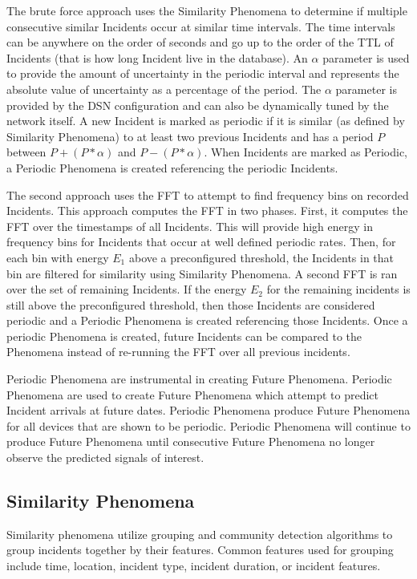 The brute force approach uses the Similarity Phenomena to determine if multiple consecutive similar Incidents occur at similar time intervals. The time intervals can be anywhere on the order of seconds and go up to the order of the TTL of Incidents (that is how long Incident live in the database). An $\alpha$ parameter is used to provide the amount of uncertainty in the periodic interval and represents the absolute value of uncertainty as a percentage of the period. The $\alpha$ parameter is provided by the DSN configuration and can also be dynamically tuned by the network itself. A new Incident is marked as periodic if it is similar (as defined by Similarity Phenomena) to at least two previous Incidents and has a period $P$ between $P + (P * \alpha)$ and $P - (P * \alpha)$. When Incidents are marked as Periodic, a Periodic Phenomena is created referencing the periodic Incidents.

The second approach uses the FFT to attempt to find frequency bins on recorded Incidents. This approach computes the FFT in two phases. First, it computes the FFT over the timestamps of all Incidents. This will provide high energy in frequency bins for Incidents that occur at well defined periodic rates. Then, for each bin with energy $E_1$ above a preconfigured threshold, the Incidents in that bin are filtered for similarity using Similarity Phenomena. A second FFT is ran over the set of remaining Incidents. If the energy $E_2$ for the remaining incidents is still above the preconfigured threshold, then those Incidents are considered periodic and a Periodic Phenomena is created referencing those Incidents. Once a periodic Phenomena is created, future Incidents can be compared to the Phenomena instead of re-running the FFT over all previous incidents.

Periodic Phenomena are instrumental in creating Future Phenomena. Periodic Phenomena are used to create Future Phenomena which attempt to predict Incident arrivals at future dates. Periodic Phenomena produce Future Phenomena for all devices that are shown to be periodic. Periodic Phenomena will continue to produce Future Phenomena until consecutive Future Phenomena no longer observe the predicted signals of interest.


\subsection{Similarity Phenomena}\label{subsec:similarity-phenomena}
Similarity phenomena utilize grouping and community detection algorithms to group incidents together by their features. Common features used for grouping include time, location, incident type, incident duration, or incident features.

